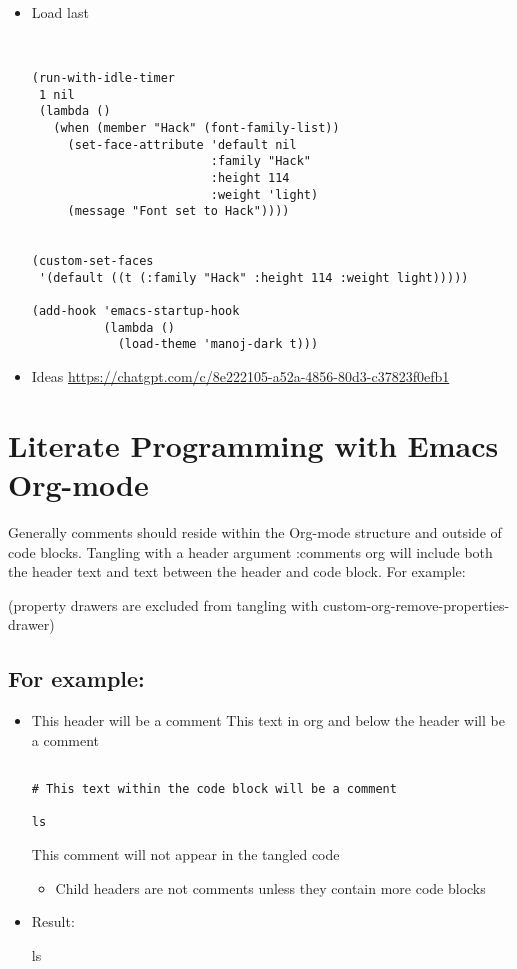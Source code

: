 \documentclass{article}
\begin{document}
\begin{itemize}
\item Load last
\label{sec:orgf36d00e}
\begin{verbatim}


(run-with-idle-timer
 1 nil
 (lambda ()
   (when (member "Hack" (font-family-list))
     (set-face-attribute 'default nil
                         :family "Hack"
                         :height 114
                         :weight 'light)
     (message "Font set to Hack"))))


(custom-set-faces
 '(default ((t (:family "Hack" :height 114 :weight light)))))

(add-hook 'emacs-startup-hook
          (lambda ()
            (load-theme 'manoj-dark t)))

\end{verbatim}
\item Ideas
\label{sec:org42bf615}
\url{https://chatgpt.com/c/8e222105-a52a-4856-80d3-c37823f0efb1}
\end{itemize}
\section*{Literate Programming with Emacs Org-mode}
\label{sec:orgd26582b}

Generally comments should reside within the Org-mode structure and outside of code blocks. Tangling with a header argument :comments org will include both the header text and text between the header and code block. For example:

(property drawers are excluded from tangling with custom-org-remove-properties-drawer)
\subsection*{For example:}
\label{sec:orge2eb0fd}
\begin{itemize}
\item This header will be a comment
\label{sec:orgc727acd}
This text in org and below the header will be a comment

\begin{verbatim}

# This text within the code block will be a comment

ls

\end{verbatim}

This comment will not appear in the tangled code

\begin{itemize}
\item Child headers are not comments unless they contain more code blocks
\label{sec:org9c1c63b}
\end{itemize}
\item Result:
\label{sec:org73b43f2}

ls
\end{itemize}
\end{document}
